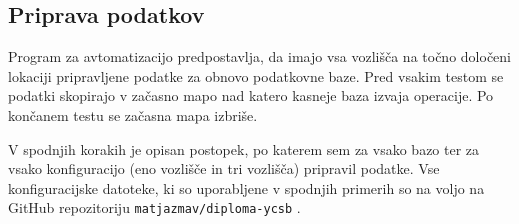 \documentclass[a4paper, 12pt]{book}
\begin{document}
\subsection{Priprava podatkov}
\label{benchmarking-prepare-data}
Program za avtomatizacijo predpostavlja, da imajo vsa vozlišča na točno določeni lokaciji pripravljene podatke za obnovo podatkovne baze. Pred vsakim testom se podatki skopirajo v začasno mapo nad katero kasneje baza izvaja operacije. Po končanem testu se začasna mapa izbriše.

V spodnjih korakih je opisan postopek, po katerem sem za vsako bazo ter za vsako konfiguracijo (eno vozlišče in tri vozlišča) pripravil podatke. Vse konfiguracijske datoteke, ki so uporabljene v spodnjih primerih so na voljo na GitHub repozitoriju \texttt{matjazmav/diploma-ycsb} \cite{matjazmav/diploma-ycsb}.
\end{document}
